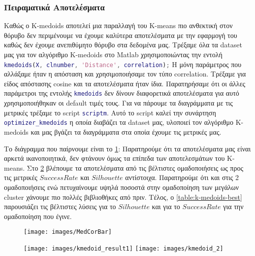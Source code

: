 \subsubsection{Πειραματικά Αποτελέσματα}
Καθώς ο K-medoids αποτελεί μια παραλλαγή του K-means πιο ανθεκτική στον θόρυβο δεν περιμένουμε να έχουμε καλύτερα αποτελέσματα με την εφαρμογή του καθώς δεν έχουμε ανεπιθύμητο θόρυβο στα δεδομένα μας. Τρέξαμε όλα τα dataset μας για τον αλγόριθμο K-medoids στο Matlab χρησιμοποιώντας την εντολή
\lstinline[language=MATLAB, breaklines=true]!kmedoids(X, clnumber, 'Distance', correlation);!
Η μόνη παράμετρος που αλλάξαμε ήταν η απόσταση και χρησιμοποιήσαμε τον τύπο correlation. Τρέξαμε για είδος απόστασης cosine και τα αποτελέσματα ήταν ίδια. Παρατηρήσαμε ότι οι άλλες παράμετροι της εντολής \lstinline[language=MATLAB]!kmedoids! δεν δίνουν διαφορετικά αποτελέσματα για αυτό χρησιμοποιήθηκαν οι default τιμές τους. Για να πάρουμε τα διαγράμματα με τις μετρικές τρέξαμε το script  \lstinline[language=MATLAB]!scriptm!. Αυτό το script καλεί την συνάρτηση \lstinline[language=MATLAB]!optimizer_kmedoids! η οποία διαβάζει τα dataset μας, υλοποιεί τον αλγόριθμο K-medoids και μας βγάζει τα διαγράμματα στα οποία έχουμε τις μετρικές μας.

Το διάγραμμα που παίρνουμε είναι το \hyperref[fig:MedCorBar]{\figurename{} \ref{fig:MedCorBar}}:
Παρατηρούμε ότι τα αποτελέσματα μας είναι αρκετά ικανοποιητικά, δεν φτάνουν όμως τα επίπεδα των αποτελεσμάτων του K-means.
Στο
\hyperref[fig:kmedoid_result]{\figurename{} \ref{fig:kmedoid_result}}
βλέπουμε τα αποτελέσματα από τις βέλτιστες ομαδοποιήσεις ως προς τις μετρικές $SuccessRate$ και $Silhouette$ αντίστοιχα.
Παρατηρούμε ότι και στις 2 ομαδοποιήσεις ενώ πετυχαίνουμε υψηλά ποσοστά στην ομαδοποίηση των μεγάλων cluster χάνουμε πιο πολλές βιβλιοθήκες από πριν.
Τέλος, ο
\hyperref[table:k-medoids-best]{\tablename{} \ref{table:k-medoids-best}}
παρουσιάζει τις βέλτιστες λύσεις για το $Silhouette$ και για το $Success Rate$ για την ομαδοποίηση που έγινε.

\begin{figure}[htbp]
    \centering
    \texttt{[image: images/MedCorBar]}
    \label{fig:MedCorBar}
\end{figure}

\begin{figure}[htbp]
    \centering
    \texttt{[image: images/kmedoid\_result1]}
    \texttt{[image: images/kmedoid\_2]}
    \label{fig:kmedoid_result}
\end{figure}


